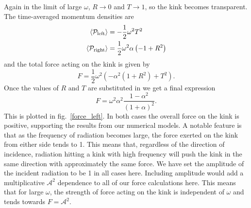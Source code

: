 \documentclass[11pt, oneside,titlepage]{article}  	%
\numberwithin{equation}{section}
\begin{document}
Again in the limit of large $\omega$, $R \rightarrow 0$ and $T \rightarrow 1$, so the kink becomes transparent. The time-averaged momentum densities are
\begin{align}
 \left \langle \mathcal{P}_\textup{left} \right \rangle &= -\frac{1}{2}\omega^2 T^2 \\
 \left \langle \mathcal{P}_\textup{right} \right \rangle &= \frac{1}{2}\omega^2\alpha \left( -1 + R^2 \right) 
\end{align}
and the total force acting on the kink is given by
\begin{equation}
F = \frac{1}{2} \omega^2 \left ( -\alpha^2(1 +R^2) + T^2 \right ) .
\end{equation}
Once the values of $R$ and $T$ are substituted in we get a final expression
\begin{equation}
F = \omega^2 \alpha^2 \frac{1-\alpha^2}{(1+\alpha)^2} .
\end{equation}
This is plotted in fig.~\ref{force_left}. In both cases the overall force on the kink is positive, supporting the results from our numerical models. A notable feature is that as the frequency of radiation becomes large, the force exerted on the kink from either side tends to 1. This means that, regardless of the direction of incidence, radiation hitting a kink with high frequency will push the kink in the same direction with approximately the same force. We have set the amplitude of the incident radiation to be 1 in all cases here. Including amplitude would add a multiplicative $\mathcal{A}^2$ dependence to all of our force calculations here. This means that for large $\omega$, the strength of force acting on the kink is independent of $\omega$ and tends towards $F = \mathcal{A}^2$. 
\end{document}

